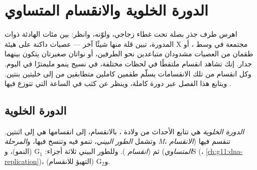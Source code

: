 \chapter{الدورة الخلوية والانقسام المتساوي}\label{ch:g11:cell-cycle-mitosis}

اهرس طرف جذر بصلة تحت غطاء زجاجي، ولوّنه، وانظر: بين مئات 
الهادئة ذوات  المدورة، تبين قلة منها شيئًا آخر --- عصيات داكنة
على هيئة X مجتمعة في وسط ، أو طقمان من العصيات مشدودان متباعدين
نحو الطرفين، أو نواتان صغيرتان يتكون بينهما جدار. إنك تشاهد انقسام
 ملتقطًا في لحظات مختلفة، في نسيج ينمو مليمترًا في اليوم. وكل
انقسام من تلك الانقسامات يسلّم طقمين كاملين متطابقين من  إلى
خليتين بنتين. ويتابع هذا الفصل  عبر دورة كاملة، وينظر عن كثب في
الساعة التي تتوزع فيها .

\section{الدورة الخلوية}

\begin{definition}\label{def:g11:cell-cycle-mitosis:cycle}
\emph{الدورة الخلوية} هي تتابع الأحداث من ولادة
، بالانقسام، إلى انقسامها هي إلى اثنتين. وتشمل \emph{الطور
البيني}، تنمو فيه  وتنسخ  فيها، و\emph{المرحلة M}، تنقسم
فيها  (\emph{الانقسام المتساوي}) ثم
 (\emph{انقسام }). وللطور البيني ثلاثة أجزاء:
$\mathrm{G_1}$ (النمو)، وS (،
\cref{ch:g11:dna-replication})، و$\mathrm{G_2}$ (التهيؤ للانقسام).
\end{definition}

